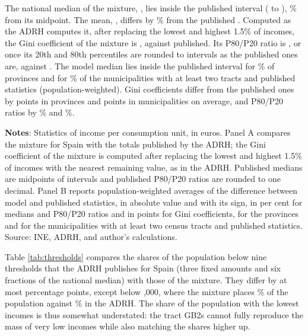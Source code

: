 The national median of the mixture, \texteuro\MixNatMedian{}, lies inside the published interval (\texteuro\AdrhNatMedianLo{} to \texteuro\AdrhNatMedianHi{}), \MixNatMedianErr{}\% from its midpoint. The mean, \texteuro\MixNatMean{}, differs by \MixNatMeanErr{}\% from the published \texteuro\AdrhNatMean{}. Computed as the ADRH computes it, after replacing the lowest and highest 1.5\% of incomes, the Gini coefficient of the mixture is \MixNatGini{}, against \AdrhNatGini{} published. Its P80/P20 ratio is \MixNatPEightyTwenty{}, or \MixNatPEightyTwentyBinned{} once its 20th and 80th percentiles are rounded to  intervals as the published ones are, against \AdrhNatPEightyTwenty{}. The model median lies inside the published interval for \ProvMedInBinPct{}\% of provinces and for \MunMedInBinPct{}\% of the \MunValN{} municipalities with at least two tracts and published statistics (population-weighted). Gini coefficients differ from the published ones by \ProvGiniAbsErr{} points in provinces and \MunGiniAbsErr{} points in municipalities on average, and P80/P20 ratios by \ProvPAbsErr{}\% and \MunPAbsErr{}\%.

\begin{table}[H]
\centering
\begin{threeparttable}
\onehalfspacing
\caption{Model and published statistics}\label{tab:aggregate}
\footnotesize

\begin{tablenotes}
\scriptsize
\textbf{Notes}: Statistics of income per consumption unit, in \BaseYear{} euros. Panel A compares the mixture for Spain with the totals published by the ADRH; the Gini coefficient of the mixture is computed after replacing the lowest and highest 1.5\% of incomes with the nearest remaining value, as in the ADRH. Published medians are midpoints of  intervals and published P80/P20 ratios are rounded to one decimal. Panel B reports population-weighted averages of the difference between model and published statistics, in absolute value and with its sign, in per cent for medians and P80/P20 ratios and in points for Gini coefficients, for the provinces and for the municipalities with at least two census tracts and published statistics. Source: INE, ADRH, and author's calculations.
\end{tablenotes}
\end{threeparttable}
\end{table}

Table \ref{tab:thresholds} compares the shares of the population below nine thresholds that the ADRH publishes for Spain (three fixed amounts and six fractions of the national median) with those of the mixture. They differ by at most \ThrOtherMaxDiff{} percentage points, except below ,000, where the mixture places \ThrFiveKModel{}\% of the population against \ThrFiveKObs{}\% in the ADRH. The share of the population with the lowest incomes is thus somewhat understated: the tract GB2s cannot fully reproduce the mass of very low incomes while also matching the shares higher up.

